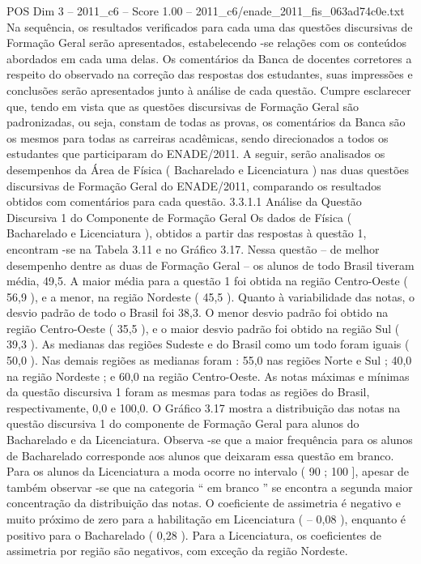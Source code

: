 \begin{textsample}{POS Dim 3 – 2011\_c6 – Score 1.00 – 2011\_c6/enade\_2011\_fis\_063ad74c0e.txt}
Na sequência, os resultados verificados para cada uma das questões discursivas de Formação Geral serão apresentados, estabelecendo -se relações com os conteúdos abordados em cada uma delas.
Os comentários da Banca de docentes corretores a respeito do observado na correção das respostas dos estudantes, suas impressões e conclusões serão apresentados junto à análise de cada questão.
Cumpre esclarecer que, tendo em vista que as questões discursivas de Formação Geral são padronizadas, ou seja, constam de todas as provas, os comentários da Banca são os mesmos para todas as carreiras acadêmicas, sendo direcionados a todos os estudantes que participaram do ENADE/2011.
A seguir, serão analisados os desempenhos da Área de Física ( Bacharelado e Licenciatura ) nas duas questões discursivas de Formação Geral do ENADE/2011, comparando os resultados obtidos com comentários para cada questão. 3.3.1.1 Análise da Questão Discursiva 1 do Componente de Formação Geral Os dados de Física ( Bacharelado e Licenciatura ), obtidos a partir das respostas à questão 1, encontram -se na Tabela 3.11 e no Gráfico 3.17.
Nessa questão – de melhor desempenho dentre as duas de Formação Geral – os alunos de todo Brasil tiveram média, 49,5.
A maior média para a questão 1 foi obtida na região Centro-Oeste ( 56,9 ), e a menor, na região Nordeste ( 45,5 ).
Quanto à variabilidade das notas, o desvio padrão de todo o Brasil foi 38,3.
O menor desvio padrão foi obtido na região Centro-Oeste ( 35,5 ), e o maior desvio padrão foi obtido na região Sul ( 39,3 ).
As medianas das regiões Sudeste e do Brasil como um todo foram iguais ( 50,0 ).
Nas demais regiões as medianas foram : 55,0 nas regiões Norte e Sul ; 40,0 na região Nordeste ; e 60,0 na região Centro-Oeste.
As notas máximas e mínimas da questão discursiva 1 foram as mesmas para todas as regiões do Brasil, respectivamente, 0,0 e 100,0.
O Gráfico 3.17 mostra a distribuição das notas na questão discursiva 1 do componente de Formação Geral para alunos do Bacharelado e da Licenciatura.
Observa -se que a maior frequência para os alunos de Bacharelado corresponde aos alunos que deixaram essa questão em branco.
Para os alunos da Licenciatura a moda ocorre no intervalo ( 90 ; 100 ], apesar de também observar -se que na categoria “ em branco ” se encontra a segunda maior concentração da distribuição das notas.
O coeficiente de assimetria é negativo e muito próximo de zero para a habilitação em Licenciatura ( – 0,08 ), enquanto é positivo para o Bacharelado ( 0,28 ).
Para a Licenciatura, os coeficientes de assimetria por região são negativos, com exceção da região Nordeste.

\end{textsample}
